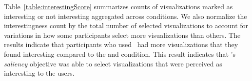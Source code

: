 Table~\ref{table:interestingScore} summarizes counts of visualizations marked as interesting or not interesting aggregated across conditions. We also normalize the interestingness count by the total number of selected visualizations to account for variations in how some participants select more visualizations than others. The results indicate that participants who used \system\ had more visualizations that they found interesting compared to the \BFS and \cluster condition. This result indicates that \system's \textit{saliency} objective was able to select visualizations that were perceived as interesting to the users. 
